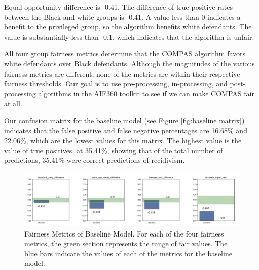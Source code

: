 \documentclass[water,article,submit,moreauthors,pdftex]{mdpi}
\begin{document}
Equal opportunity difference is -0.41. The difference of true positive
rates between the Black and white groups is -0.41. A value less than 0
indicates a benefit to the privileged group, so the algorithm benefits
white defendants. The value is substantially less than -0.1, which
indicates that the algorithm is unfair.

All four group fairness metrics determine that the COMPAS algorithm
favors white defendants over Black defendants. Although the magnitudes
of the various fairness metrics are different, none of the metrics are
within their respective fairness thresholds. Our goal is to use
pre-processing, in-processing, and post-processing algorithms in the
AIF360 toolkit to see if we can make COMPAS fair at all.

Our confusion matrix for the baseline model (see Figure
\ref{fig:baseline matrix}) indicates that the false positive and false
negative percentages are 16.68\% and 22.06\%, which are the lowest
values for this matrix. The highest value is the value of true
positives, at 35.41\%, showing that of the total number of predictions,
35.41\% were correct predictions of recidivism.

\begin{figure}

{\centering \includegraphics[width=1\linewidth]{../images/baseline_metrics} 

}

\caption{Fairness Metrics of Baseline Model. For each of the four fairness metrics, the green section represents the range of fair values. The blue bars indicate the values of each of the metrics for the baseline model.}\label{fig:baseline metrics}
\end{figure}
\end{document}
